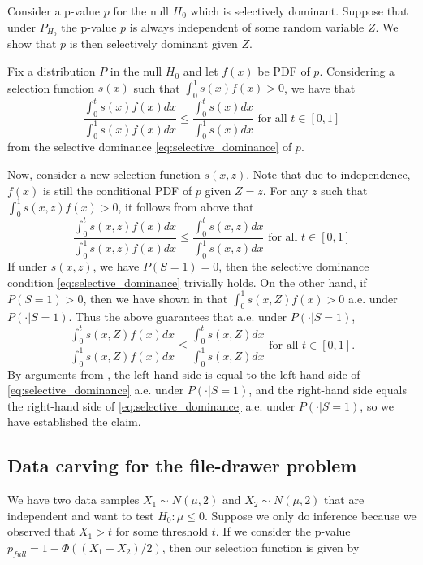 \documentclass{article}
\begin{document}
\begin{appendix}
Consider a p-value $p$ for the null $H_0$ which is selectively dominant. Suppose that under $P_{H_0}$ the p-value $p$ is always independent of some random variable $Z$. We show that $p$ is then selectively dominant given $Z$. 

Fix a distribution $P$ in the null $H_0$ and let $f(x)$ be PDF of $p$. Considering a selection function $s(x)$ such that $\int_0^1 s(x) f(x) > 0$, we have that 
\begin{equation*}
    \frac{\int_0^t s(x) f(x) dx }{\int_0^1 s(x) f(x) dx } \leq  \frac{\int_0^t s(x) dx }{\int_0^1 s(x)dx } \text{ for all } t \in [0, 1]
\end{equation*}
from the selective dominance \eqref{eq:selective_dominance} of $p$. 

Now, consider a new selection function $s(x, z)$. Note that due to independence, $f(x)$ is still the conditional PDF of $p$ given $Z=z$.  For any $z$ such that $\int_0^1 s(x, z) f(x) > 0$, it follows from above that 
\begin{equation*}
    \frac{\int_0^t s(x, z) f(x) dx }{\int_0^1 s(x, z) f(x) dx } \leq  \frac{\int_0^t s(x, z) dx }{\int_0^1 s(x, z)dx } \text{ for all } t \in [0, 1]
\end{equation*}
If under $s(x, z)$, we have $P(S=1) = 0$, then the selective dominance condition \eqref{eq:selective_dominance} trivially holds. On the other hand, if $P(S=1) > 0$, then we have shown in  that $\int_0^1 s(x, Z) f(x) > 0$ a.e. under $P(\cdot | S=1)$. Thus the above guarantees that a.e. under $P(\cdot | S=1)$,
\begin{equation*}
    \frac{\int_0^t s(x, Z) f(x) dx }{\int_0^1 s(x, Z) f(x) dx } \leq  \frac{\int_0^t s(x, Z) dx }{\int_0^1 s(x, Z)dx } \text{ for all } t \in [0, 1].
\end{equation*}
By arguments from , the left-hand side is equal to the left-hand side of \eqref{eq:selective_dominance} a.e. under $P(\cdot | S=1)$, and the right-hand side equals the right-hand side of \eqref{eq:selective_dominance} a.e. under $P(\cdot | S=1)$, so we have established the claim. 


\subsection{Data carving for the file-drawer problem}
\label{sec:carve_appdx}

We have two data samples $X_1 \sim N(\mu, 2)$ and $X_2 \sim N(\mu, 2)$ that are independent and want to test $H_0 : \mu \leq 0$. Suppose we only do inference because we observed that $X_1  > t$ for some threshold $t$. If we consider the p-value $p_{full} = 1 - \Phi((X_1 + X_2)/2  )$, then our selection function is given by 


\end{appendix}
\end{document}
